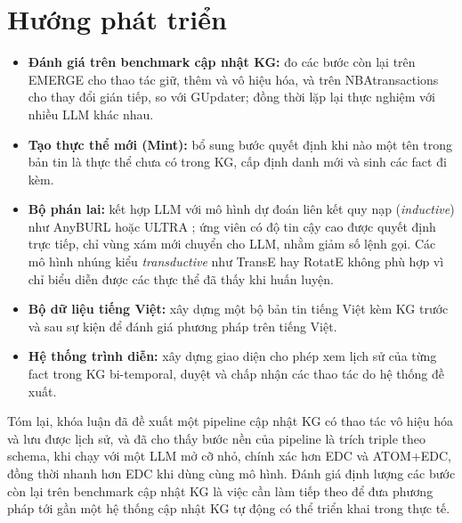 \section{Hướng phát triển}
\label{sec:conclusion-future}

\begin{itemize}
  \item \textbf{Đánh giá trên benchmark cập nhật KG:}
  đo các bước còn lại trên EMERGE \cite{zaporojets2025emerge} cho thao tác giữ, thêm và vô hiệu hóa,
  và trên NBAtransactions \cite{tang2019gupdate} cho thay đổi gián tiếp, so với GUpdater;
  đồng thời lặp lại thực nghiệm với nhiều LLM khác nhau.

  \item \textbf{Tạo thực thể mới (Mint):}
  bổ sung bước quyết định khi nào một tên trong bản tin là thực thể chưa có trong KG,
  cấp định danh mới và sinh các fact đi kèm.

  \item \textbf{Bộ phán lai:}
  kết hợp LLM với mô hình dự đoán liên kết quy nạp (\textit{inductive}) như AnyBURL \cite{meilicke2019anyburl} hoặc ULTRA \cite{galkin2024ultra};
  ứng viên có độ tin cậy cao được quyết định trực tiếp, chỉ vùng xám mới chuyển cho LLM, nhằm giảm số lệnh gọi.
  Các mô hình nhúng kiểu \textit{transductive} như TransE \cite{bordes2013transe} hay RotatE \cite{sun2019rotate}
  không phù hợp vì chỉ biểu diễn được các thực thể đã thấy khi huấn luyện.

  \item \textbf{Bộ dữ liệu tiếng Việt:}
  xây dựng một bộ bản tin tiếng Việt kèm KG trước và sau sự kiện để đánh giá phương pháp trên tiếng Việt.

  \item \textbf{Hệ thống trình diễn:}
  xây dựng giao diện cho phép xem lịch sử của từng fact trong KG bi-temporal,
  duyệt và chấp nhận các thao tác do hệ thống đề xuất.
\end{itemize}

Tóm lại, khóa luận đã đề xuất một pipeline cập nhật KG có thao tác vô hiệu hóa và lưu được lịch sử,
và đã cho thấy bước nền của pipeline là trích triple theo schema,
khi chạy với một LLM mở cỡ nhỏ, chính xác hơn EDC và ATOM+EDC, đồng thời nhanh hơn EDC khi dùng cùng mô hình.
Đánh giá định lượng các bước còn lại trên benchmark cập nhật KG là việc cần làm tiếp theo
để đưa phương pháp tới gần một hệ thống cập nhật KG tự động có thể triển khai trong thực tế.
